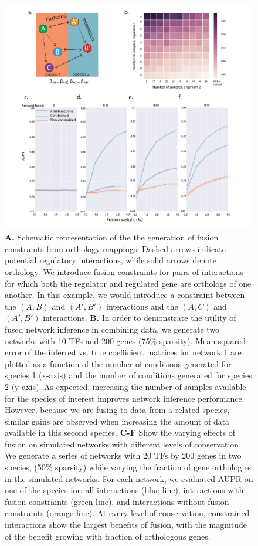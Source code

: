 \documentclass[11pt]{article}
\begin{document}
\begin{figure}
\begin{center}
  \includegraphics[scale=0.45]{fig1.pdf}
  \caption{\label{fusion} \textbf{A.} Schematic representation of the the generation of fusion constraints from orthology mappings. Dashed arrows indicate potential regulatory interactions, while solid arrows denote orthology. We introduce fusion constraints for pairs of interactions for which both the regulator and regulated gene are orthologs of one another. 
  In this example, we would introduce a constraint between the $(A, B)$ and $(A', B')$ interactions and the $(A, C)$ and $(A', B')$ interactions. \textbf{B.} 
  In order to demonstrate the utility of fused network inference in combining data, we generate two networks with 10 TFs and 200 genes (75\% sparsity). Mean squared error of the inferred vs. true coefficient matrices for network 1 are plotted as a function of the number of conditions generated for species 1 (x-axis) and the number of conditions generated for species 2 (y-axis). 
  As expected, increasing the number of samples available for the species of interest improves network inference performance. 
  However, because we are fusing to data from a related species, similar gains are observed when increasing the amount of data available in this second species. 
  \textbf{C-F} Show the varying effects of fusion on simulated networks with different levels of conservation. We generate a series of networks with 20 TFs by 200 genes in two species, (50\% sparsity) while varying the fraction of gene orthologies in the simulated networks. For each network, we evaluated AUPR on one of the species for: all interactions (blue line), interactions with fusion constraints (green line), and interactions without fusion constraints (orange line). At every level of conservation, constrained interactions show the largest benefits of fusion, with the magnitude of the benefit growing with fraction of orthologous genes. 
}
\end{center}
\end{figure}
\end{document}
